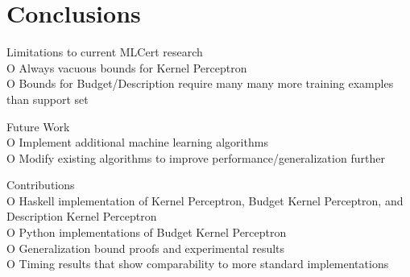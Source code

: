 \chapter{Conclusions}\label{ConclusionsChapter}

Limitations to current MLCert research
\\O Always vacuous bounds for Kernel Perceptron
\\O Bounds for Budget/Description require many many more training examples than support set

Future Work
\\O Implement additional machine learning algorithms
\\O Modify existing algorithms to improve performance/generalization further

Contributions
\\O Haskell implementation of Kernel Perceptron, Budget Kernel Perceptron, and Description Kernel Perceptron
\\O Python implementations of Budget Kernel Perceptron
\\O Generalization bound proofs and experimental results
\\O Timing results that show comparability to more standard implementations
